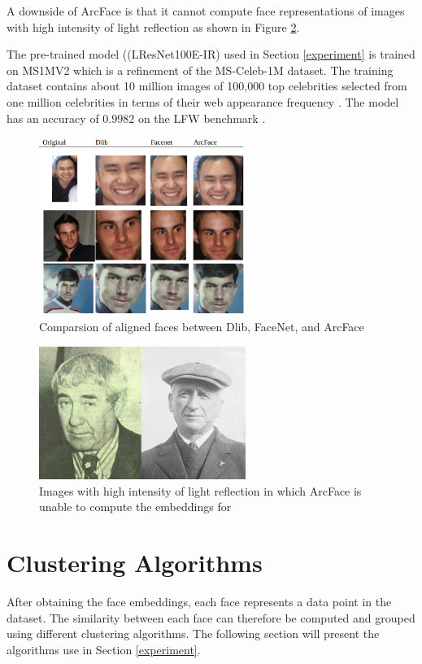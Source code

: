 \documentclass[12pt,english]{article}
\begin{document}
A downside of ArcFace is that it cannot compute face representations of images with high intensity of light reflection \cite{chinapas} as shown in Figure \ref{fig:arcface2}.

The pre-trained model ((LResNet100E-IR) used in Section \ref{experiment} is trained on MS1MV2 which is a refinement of the MS-Celeb-1M dataset. The training dataset contains about 10 million images of 100,000 top celebrities selected from one million celebrities in terms of their web appearance frequency \cite{deng}. The model has an accuracy of $0.9982$ on the LFW benchmark \cite{deng2019}.

\begin{figure}[!tbp]
 \centering
    \includegraphics[width=0.6\textwidth]{figures/comparison.png}
    \caption{Comparsion of aligned faces between Dlib, FaceNet, and ArcFace \cite{chinapas}}
	\label{fig:arcface1}
\end{figure}

\begin{figure}[!tbp]
 \centering
    \includegraphics[width=0.6\textwidth]{figures/ex.png}
    \caption{Images with high intensity of light reflection in which ArcFace is unable to compute the embeddings for \cite{chinapas}}
	\label{fig:arcface2}
\end{figure}

\section{Clustering Algorithms}
\label{clustering}
\quad
After obtaining the face embeddings, each face represents a data point in the dataset. The similarity between each face can therefore be computed and grouped using different clustering algorithms. The following section will present the algorithms use in Section \ref{experiment}. 
\end{document}
